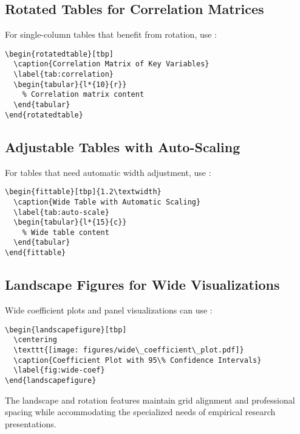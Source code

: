 \documentclass[11pt]{article}
\begin{document}
\subsection{Rotated Tables for Correlation Matrices}

For single-column tables that benefit from rotation, use :

\begin{verbatim}
\begin{rotatedtable}[tbp]
  \caption{Correlation Matrix of Key Variables}
  \label{tab:correlation}
  \begin{tabular}{l*{10}{r}}
    % Correlation matrix content
  \end{tabular}
\end{rotatedtable}
\end{verbatim}

\subsection{Adjustable Tables with Auto-Scaling}

For tables that need automatic width adjustment, use :

\begin{verbatim}
\begin{fittable}[tbp]{1.2\textwidth}
  \caption{Wide Table with Automatic Scaling}
  \label{tab:auto-scale}
  \begin{tabular}{l*{15}{c}}
    % Wide table content
  \end{tabular}
\end{fittable}
\end{verbatim}

\subsection{Landscape Figures for Wide Visualizations}

Wide coefficient plots and panel visualizations can use :

\begin{verbatim}
\begin{landscapefigure}[tbp]
  \centering
  \texttt{[image: figures/wide\_coefficient\_plot.pdf]}
  \caption{Coefficient Plot with 95\% Confidence Intervals}
  \label{fig:wide-coef}
\end{landscapefigure}
\end{verbatim}

The landscape and rotation features maintain grid alignment and professional spacing while accommodating the specialized needs of empirical research presentations.
\end{document}
